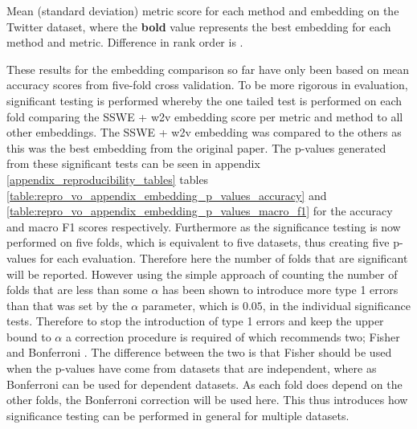 \FloatBarrier
\begin{table}[!h]
    \centering
    
    \caption{Mean (standard deviation) metric score for each method and embedding on the \citet{dong-etal-2014-adaptive} Twitter dataset, where the \textbf{bold} value represents the best embedding for each method and metric. Difference in rank order is .}
    \label{table:repro_vo_word_embeddings_results}
\end{table}
\FloatBarrier

These results for the embedding comparison so far have only been based on mean accuracy scores from five-fold cross validation. To be more rigorous in evaluation, significant testing is performed whereby the one tailed test is performed on each fold comparing the SSWE + w2v embedding score per metric and method to all other embeddings. The SSWE + w2v embedding was compared to the others as this was the best embedding from the original paper. The p-values generated from these significant tests can be seen in appendix \ref{appendix_reproducibility_tables} tables \ref{table:repro_vo_appendix_embedding_p_values_accuracy} and \ref{table:repro_vo_appendix_embedding_p_values_macro_f1} for the accuracy and macro F1 scores respectively. Furthermore as the significance testing is now performed on five folds, which is equivalent to five datasets, thus creating five p-values for each evaluation. Therefore here the number of folds that are significant will be reported. However using the simple approach of counting the number of folds that are less than some $\alpha$ has been shown to introduce more type 1 errors \citep{dror-etal-2017-replicability} than that was set by the $\alpha$ parameter, which is $0.05$, in the individual significance tests. Therefore to stop the introduction of type 1 errors and keep the upper bound to $\alpha$ a correction procedure is required of which \citet{dror-etal-2018-hitchhikers} recommends two; Fisher and Bonferroni \citep{benjamini2008screening}. The difference between the two is that Fisher should be used when the p-values have come from datasets that are independent, where as Bonferroni can be used for dependent datasets. As each fold does depend on the other folds, the Bonferroni correction will be used here. This thus introduces how significance testing can be performed in general for multiple datasets.

